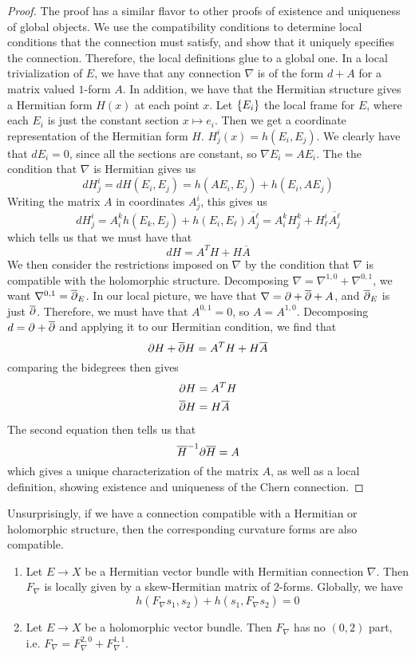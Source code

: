 \begin{proof}
The proof has a similar flavor to other proofs of existence and uniqueness of global
objects. We use the compatibility conditions to determine local conditions that
the connection must satisfy, and show that it uniquely specifies the connection.
Therefore, the local definitions glue to a global one. In a local trivialization
of $E$, we have that any connection $\nabla$ is of the form $d + A$ for a matrix
valued $1$-form $A$. In addition, we have that the Hermitian structure gives a
Hermitian form $H(x)$ at each point $x$. Let $\left\lbrace E_i \right\rbrace$ the local
frame for $E$, where each $E_i$ is just the constant section $x \mapsto e_i$. Then we
get a coordinate representation of the Hermitian form $H$.
$H^i_j(x) = h(E_i,E_j)$. We clearly have that $dE_i = 0$, since all the sections
are constant, so $\nabla E_i = AE_i$. The the condition that $\nabla$ is Hermitian gives
us
\[
dH^i_j  = dH(E_i,E_j) = h(AE_i, E_j) + h(E_i, AE_j)
\]
Writing the matrix $A$ in coordinates $A^i_j$, this gives us
\[
dH^i_j = A^k_ih(E_k, E_j) + h(E_i, E_\ell)\overline{A^\ell_j}
= A^k_iH^k_j + H^i_\ell \overline{A^\ell_j}
\]
which tells us that we must have that
\[
dH = A^T H + H\overline{A}
\]
We then consider the restrictions imposed on $\nabla$ by the condition that
$\nabla$ is compatible with the holomorphic structure. Decomposing
$\nabla = \nabla^{1,0} + \nabla^{0,1}$, we want $\nabla^{0,1} = \overline{\partial}_E$. In our local
picture, we have that $\nabla = \partial + \overline{\partial} + A$, and $\overline{\partial}_E$ is just $\overline{\partial}$.
Therefore, we must have that $A^{0,1} = 0$, so $A = A^{1,0}$. Decomposing
$d = \partial + \overline{\partial}$ and applying it to our Hermitian condition, we find that
\[
\partial H + \overline{\partial} H = A^T H + H\overline{A}
\]
comparing the bidegrees then gives
\begin{align*}
\partial H &= A^TH\\
\overline{\partial} H &= H\overline{A}
\end{align*}
The second equation then tells us that
\[
\overline{H}^{-1}\partial \overline{H} = A
\]
which gives a unique characterization of the matrix $A$, as well as a local definition,
showing existence and uniqueness of the Chern connection.
\end{proof}
%
Unsurprisingly, if we have a connection compatible with a Hermitian or holomorphic
structure, then the corresponding curvature forms are also compatible.
%
\begin{prop} \enumbreak
\begin{enumerate}
  \item Let $E \to X$ be a Hermitian vector bundle with Hermitian connection $\nabla$.
  Then $F_\nabla$ is locally given by a skew-Hermitian matrix of $2$-forms.
  Globally, we have
  \[
  h(F_\nabla s_1, s_2) + h(s_1, F_\nabla s_2) = 0
  \]
  \item Let $E \to X$ be a holomorphic vector bundle. Then $F_\nabla$ has
  no $(0,2)$ part, i.e. $F_\nabla = F^{2,0}_\nabla + F^{1,1}_\nabla$.
\end{enumerate}
\end{prop}
